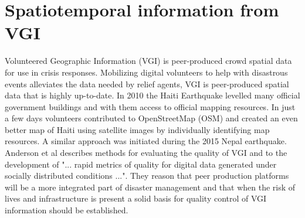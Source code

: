 \section{Spatiotemporal information from VGI}
Volunteered Geographic Information (VGI) is peer-produced crowd spatial data for use in crisis responses. Mobilizing digital volunteers to help with disastrous events alleviates the data needed by relief agents, VGI is peer-produced spatial data that is highly up-to-date. In 2010 the Haiti Earthquake levelled many official government buildings and with them access to official mapping resources\cite{palen2015success}. In just a few days volunteers contributed to OpenStreetMap\cite{OpenStreetMap} (OSM) and created an even better map of Haiti using satellite images by individually identifying map resources. A similar approach was initiated during the 2015 Nepal earthquake\cite{hu2016task}. Anderson et al\cite{anderson2018crowd} describes methods for evaluating the quality of VGI and to the development of "... rapid metrics of quality for digital data generated under socially distributed conditions ...". They reason that peer production platforms will be a more integrated part of disaster management and that when the risk of lives and infrastructure is present a solid basis for quality control of VGI information should be established.

